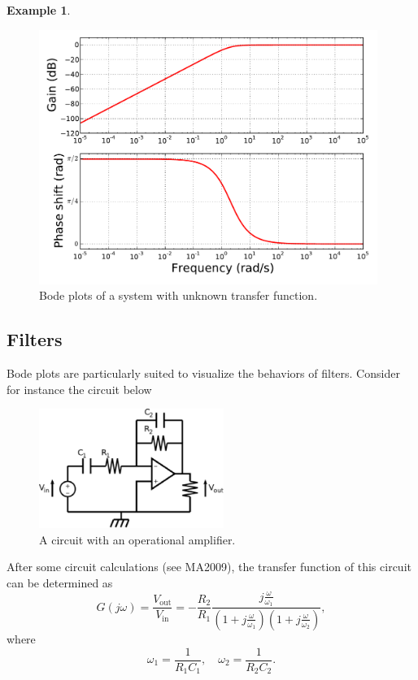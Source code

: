 \documentclass[a4paper,11pt]{report}
\theoremstyle{definition}
\newtheorem{mdexample}{Example}
\newenvironment{example}%
  {\vspace{0.1cm}\begin{mdframed}[backgroundcolor=lightgray]\begin{mdexample}}%
  {\end{mdexample}\end{mdframed}\vspace{0.1cm}}
\begin{document}
\begin{example}
  \begin{figure}[H]
    \centering
    \includegraphics[width=11cm]{fig/exbode.pdf}
    \caption{Bode plots of a system with unknown transfer function.}
    \label{fig:exbode}
  \end{figure}

\end{example}


\subsection{Filters}

Bode plots are particularly suited to visualize the behaviors of
filters. Consider for instance the circuit below

\begin{figure}[H]
  \centering
  \includegraphics[width=6cm]{fig/circuit.png}
  \caption{A circuit with an operational amplifier.}
  \label{fig:circuit}
\end{figure}

After some circuit calculations (see MA2009), the transfer function
of this circuit can be determined as
\[
G(j\omega) = \frac{V_\textrm{out}}{V_\textrm{in}} = 
-\frac{R_2}{R_1}\frac{j\frac{\omega}{\omega_1}}
{\left(1+j\frac{\omega}{\omega_1}\right)\left(1+j\frac{\omega}{\omega_2}\right)},
\]
where
\[
\omega_1=\frac{1}{R_1C_1}, \quad \omega_2=\frac{1}{R_2C_2}.
\]
\end{document}
